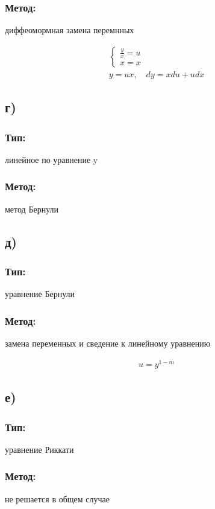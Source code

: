\documentclass{article}
\begin{document}
\subsubsection*{Метод:}
диффеомормная замена перемнных

\begin{gather*}
\begin{cases}
\frac{y}{x}=u \\
x=x
\end{cases}\\
y=ux, \quad   dy=xdu+udx 
\end{gather*}

\subsection*{г)}
\subsubsection*{Тип:} 
линейное по уравнение y

\subsubsection*{Метод:}
метод Бернули

\subsection*{д)}
\subsubsection*{Тип:} 
уравнение Бернули

\subsubsection*{Метод:}
замена переменных и сведение к линейному уравнению

\begin{gather*}
    u=y^{1-m}
\end{gather*}

\subsection*{е)}
\subsubsection*{Тип:} 
уравнение Риккати

\subsubsection*{Метод:}
не решается в общем случае
\end{document}
